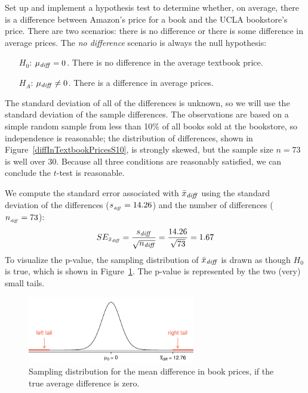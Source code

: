 \begin{example}{Set up and implement a hypothesis test to determine whether, on average, there is a difference between Amazon's price for a book and the UCLA bookstore's price.}
\label{htForDiffInUCLAAndAmazonTextbookPrices}
There are two scenarios: there is no difference or there is some difference in average prices. The \emph{no difference} scenario is always the null hypothesis:
\begin{itemize}
\setlength{\itemsep}{0mm}
\item[$H_0$:] $\mu_{\text{\emph{diff}}}=0$. There is no difference in the average textbook price.
\item[$H_A$:] $\mu_{\text{\emph{diff}}} \neq 0$. There is a difference in average prices.
\end{itemize}
The standard deviation of all of the differences is unknown, so we will use the standard deviation of the sample differences. The observations are based on a simple random sample from less than 10\% of all books sold at the bookstore, so independence is reasonable; the distribution of differences, shown in Figure~\ref{diffInTextbookPricesS10}, is strongly skewed, but the sample size $n=73$ is well over 30. Because all three conditions are reasonably satisfied, we can conclude the $t$-test is reasonable.

We compute the standard error associated with $\bar{x}_{\text{\emph{diff}}}$ using the standard deviation of the differences ($s_{_{\text{\emph{diff}}}}=14.26$) and the number of differences ($n_{_{\text{\emph{diff}}}}=73$):
$$SE_{\bar{x}_{\text{\emph{diff}}}} = \frac{s_{\text{\emph{diff}}}}{\sqrt{n_{\text{\emph{diff}}}}} = \frac{14.26}{\sqrt{73}} = 1.67$$
To visualize the p-value, the sampling distribution of $\bar{x}_{\text{\emph{diff}}}$ is drawn as though $H_0$ is true, which is shown in Figure~\ref{textbooksS10HTTails}. The p-value is represented by the two (very) small tails.

\begin{figure}
\centering
\includegraphics[width=0.65\textwidth]{ch_inference_for_means/figures/textbooksS10/textbooksS10HTTails}
\caption{Sampling distribution for the mean difference in book prices, if the true average difference is zero.}
\label{textbooksS10HTTails}
\end{figure}


\end{example}
